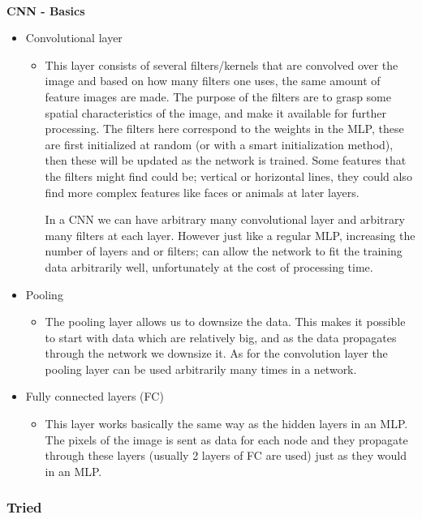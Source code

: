 \documentclass[11pt,a4paper,UKenglish]{article}
\begin{document}
\noindent \\ \textbf{CNN - Basics}
\begin{itemize}
 \item{Convolutional layer}
 \begin{itemize}
  \item{This layer consists of several filters/kernels that are convolved over
  the image and based on how many filters one uses, the same amount of feature
  images are made. The purpose of the filters are to grasp some spatial
  characteristics of the image, and make it available for further processing.
  The filters here correspond to the weights in the MLP, these are first
  initialized at random (or with a smart initialization method), then these
  will be updated as the network is trained. Some features that the filters
  might find could be; vertical or horizontal lines, they could also find more
  complex features like faces or animals at later layers. \par
  In a CNN we can have arbitrary many convolutional layer and arbitrary many
  filters at each layer. However just like a regular MLP, increasing the
  number of layers and or filters; can allow the network to fit the training
  data arbitrarily well, unfortunately at the cost of processing time.}
 \end{itemize}
 \item{Pooling}
 \begin{itemize}
  \item{The pooling layer allows us to downsize the data. This makes it
  possible to start with data which are relatively big, and as the data propagates
  through the network we downsize it. As for the convolution layer the pooling
  layer can be used arbitrarily many times in a network.}
 \end{itemize}
 \item{Fully connected layers (FC)}
 \begin{itemize}
  \item{This layer works basically the same way as the hidden layers in an MLP.
  The pixels of the image is sent as data for each node and they propagate
  through these layers (usually 2 layers of FC are used) just as they would in
  an MLP.}
 \end{itemize}
\end{itemize}

\subsubsection{Tried}
\end{document}
